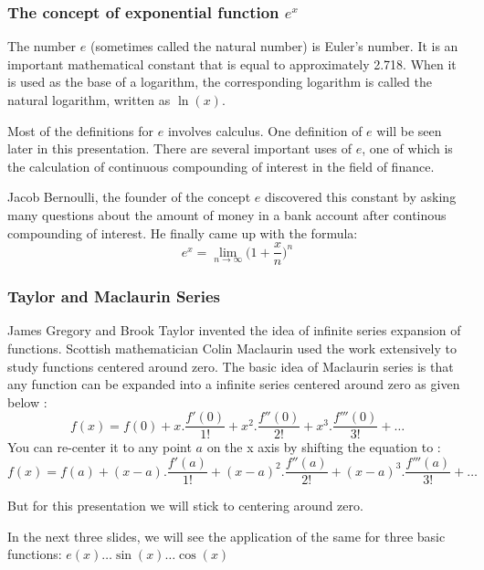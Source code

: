 \documentclass[10pt]{beamer}
\begin{document}
\begin{frame}
	\frametitle{The concept of exponential function $e^x$}
	
The number $e$ (sometimes called the natural number) is Euler's number. It is an important mathematical constant that is equal to approximately 2.718. When it is used as the base of a logarithm, the corresponding logarithm is called the natural logarithm, written as $\ln(x)$. \vspace{10pt}

Most of the definitions for $e$ involves calculus. One definition of $e$ will be seen later in this presentation. There are several important uses of $e$, one of which is the calculation of continuous compounding of interest in the field of finance. \vspace{10pt}

Jacob Bernoulli, the founder of the concept $e$ discovered this constant by asking many questions about the amount of money in a bank account after continous compounding of interest. He finally came up with the formula: \\

$$e^x = \lim_{n\to\infty}\Big(1+\dfrac{x}{n}\Big)^n$$
	
\end{frame}
\begin{frame}
	\frametitle{Taylor and Maclaurin Series}
	James Gregory and Brook Taylor invented the idea of infinite series expansion of functions.  Scottish mathematician Colin Maclaurin used the work extensively to study functions centered around zero.  The basic idea of Maclaurin series is that any function can be expanded into a infinite series centered around zero as given below :
	{\large {$$f(x) = f(0)+x.\dfrac{f'(0)}{1!}+ x^2.\dfrac{f''(0)}{2!} +x^3.\dfrac{f'''(0)}{3!} + \dots$$}}
	You can re-center it to any point $a$ on the x axis by shifting the equation to  :
	{\large {$$f(x) = f(a)+(x-a).\dfrac{f'(a)}{1!}+ (x-a)^2.\dfrac{f''(a)}{2!} +(x-a)^3.\dfrac{f'''(a)}{3!} + \dots$$}}
	
	But for this presentation we will stick to centering around zero. 
	\vspace{10pt}

	In the next three slides, we will see the application of the same for three basic functions: $e(x) \dots \sin(x) \dots \cos(x)$
\end{frame}
\end{document}
